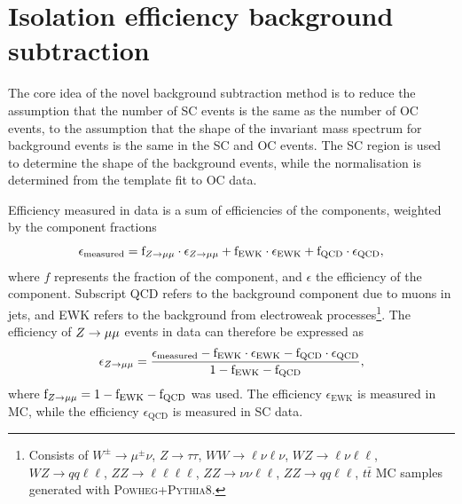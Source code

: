 \section{Isolation efficiency background subtraction}

The core idea of the novel background subtraction method is to
reduce the assumption that the number of SC events is the same as
the number of OC events, to the assumption that the shape of the
invariant mass spectrum for background events is the same in the
SC and OC events. The SC region is used to determine the shape
of the background events, while the normalisation is determined
from the template fit to OC data.

Efficiency measured in data is a sum of efficiencies of the
components, weighted by the component fractions
\begin{equation}
\epsilon_\text{measured} =
\text{f}_{Z \rightarrow \mu\mu}   \cdot \epsilon_{Z \rightarrow \mu\mu} +
\text{f}_\text{EWK} \cdot \epsilon_\text{EWK} + 
\text{f}_\text{QCD} \cdot \epsilon_\text{QCD},
\end{equation}
where $f$ represents the fraction of the component, and $\epsilon$
the efficiency of the component. Subscript QCD refers to the
background component due to muons in jets, and EWK refers to the
background from electroweak processes\footnote{Consists of
$W^\pm\rightarrow\mu^\pm \nu$, $Z\rightarrow \tau\tau$,
$WW\rightarrow \ell \nu \ell \nu$, $WZ\rightarrow \ell \nu \ell \ell$,
$WZ\rightarrow qq \ell \ell$, $ZZ\rightarrow\ell\ell\ell\ell$,
$ZZ\rightarrow\nu\nu\ell\ell$, $ZZ\rightarrow qq\ell\ell$,
$t\bar t$ MC samples generated with \textsc{Powheg}+\textsc{Pythia}8.}.
The efficiency of $Z \rightarrow \mu\mu$ events in data can therefore be expressed as
\begin{equation}
\epsilon_{Z \rightarrow \mu\mu} = \frac
{\epsilon_\text{measured} - \text{f}_\text{EWK} \cdot \epsilon_\text{EWK} - \text{f}_\text{QCD} \cdot \epsilon_\text{QCD}}
{1 - \text{f}_\text{EWK} - \text{f}_\text{QCD}},
\end{equation}
where $\text{f}_{Z \rightarrow \mu\mu} = 1 - \text{f}_\text{EWK} - \text{f}_\text{QCD}$
was used. The efficiency $\epsilon_\text{EWK}$ is measured in MC,
while the efficiency $\epsilon_\text{QCD}$ is measured in SC data.


